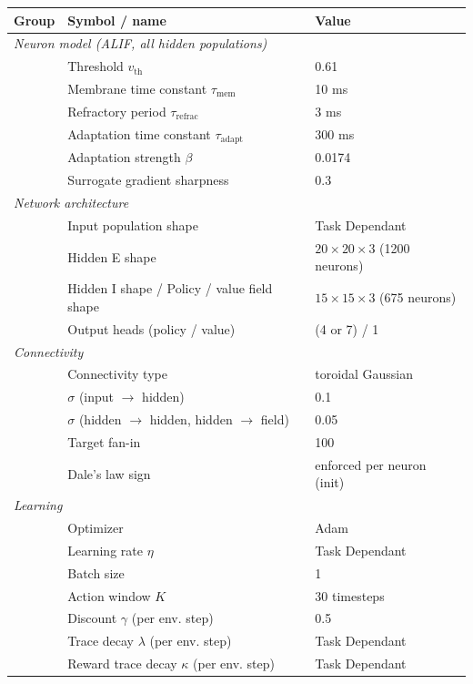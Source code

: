 \begin{table}[h!]
\centering
\small
\begin{tabular}{@{}l l l@{}}
\toprule
\textbf{Group} & \textbf{Symbol / name} & \textbf{Value} \\
\midrule
\multicolumn{3}{l}{\textit{Neuron model (ALIF, all hidden populations)}} \\
& Threshold $v_{\mathrm{th}}$ & 0.61 \\
& Membrane time constant $\tau_{\mathrm{mem}}$ & 10 ms \\
& Refractory period $\tau_{\mathrm{refrac}}$ & 3 ms \\
& Adaptation time constant $\tau_{\mathrm{adapt}}$ & 300 ms \\
& Adaptation strength $\beta$ & 0.0174 \\
& Surrogate gradient sharpness & 0.3 \\
\midrule
\multicolumn{3}{l}{\textit{Network architecture}} \\
& Input population shape & Task Dependant \\
& Hidden E shape & $20 \times 20 \times 3$ (1200 neurons) \\
& Hidden I shape / Policy / value field shape  & $15 \times 15 \times 3$ (675 neurons) \\
& Output heads (policy / value) & (4 or 7) / 1 \\
\midrule
\multicolumn{3}{l}{\textit{Connectivity}} \\
& Connectivity type & toroidal Gaussian \\
& $\sigma$ (input $\to$ hidden) & 0.1 \\
& $\sigma$ (hidden $\to$ hidden, hidden $\to$ field) & 0.05 \\
& Target fan-in & 100 \\
& Dale's law sign & enforced per neuron (init) \\
\midrule
\multicolumn{3}{l}{\textit{Learning}} \\
& Optimizer & Adam \\
& Learning rate $\eta$ & Task Dependant\\
& Batch size & 1 \\
& Action window $K$ & 30 timesteps \\
& Discount $\gamma$ (per env. step) & 0.5 \\
& Trace decay $\lambda$ (per env. step) & Task Dependant \\
& Reward trace decay $\kappa$ (per env. step) & Task Dependant \\

\end{tabular}
\end{table}
